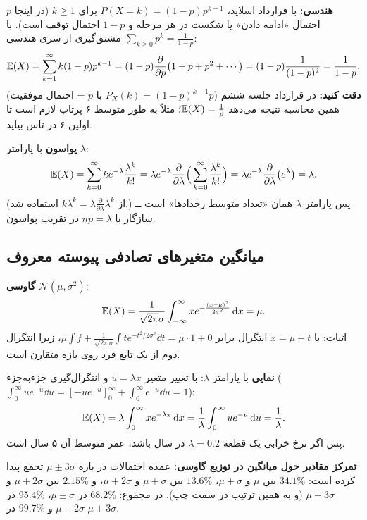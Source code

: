 \begin{example}
\textbf{هندسی:} با قرارداد اسلاید، $P(X=k)=(1-p)p^{k-1}$ برای $k\ge1$ (در اینجا $p$ احتمال «ادامه دادن» یا شکست در هر مرحله و $1-p$ احتمال توقف است). با مشتق‌گیری از سری هندسی $\sum_{k\ge0}p^k=\frac1{1-p}$:
\[
\mathbb{E}(X)=\sum_{k=1}^{\infty}k(1-p)p^{k-1}=(1-p)\frac{\partial}{\partial p}\big(1+p+p^2+\cdots\big)=(1-p)\frac{1}{(1-p)^2}=\frac{1}{1-p}.
\]
\textbf{دقت کنید:} در قرارداد جلسه ششم ($P_X(k)=(1-p)^{k-1}p$ با $p$ = احتمال موفقیت) همین محاسبه نتیجه می‌دهد $\mathbb{E}(X)=\frac1p$؛ مثلاً به طور متوسط ۶ پرتاب لازم است تا اولین ۶ در تاس بیاید.

\textbf{پواسون} با پارامتر $\lambda$:
\[
\mathbb{E}(X)=\sum_{k=0}^{\infty}ke^{-\lambda}\frac{\lambda^k}{k!}=\lambda e^{-\lambda}\frac{\partial}{\partial\lambda}\Big(\sum_{k=0}^{\infty}\frac{\lambda^k}{k!}\Big)=\lambda e^{-\lambda}\frac{\partial}{\partial\lambda}\big(e^\lambda\big)=\lambda .
\]
(از $k\lambda^k=\lambda\frac{\partial}{\partial\lambda}\lambda^k$ استفاده شد.) پس پارامتر $\lambda$ همان «تعداد متوسط رخدادها» است ــ سازگار با $np=\lambda$ در تقریب پواسون.
\end{example}

\subsection{میانگین متغیرهای تصادفی پیوسته معروف}

\begin{example}
\textbf{گاوسی} $\mathcal N(\mu,\sigma^2)$:
\[
\mathbb{E}(X)=\frac{1}{\sqrt{2\pi}\sigma}\int_{-\infty}^{\infty}xe^{-\frac{(x-\mu)^2}{2\sigma^2}}\,\mathrm{d} x=\mu .
\]
اثبات: با $x=\mu+t$ انتگرال برابر $\mu\int f+\frac1{\sqrt{2\pi}\sigma}\int te^{-t^2/2\sigma^2}\dd t=\mu\cdot1+0$، زیرا انتگرال دوم از یک تابع فرد روی بازه متقارن است.

\textbf{نمایی} با پارامتر $\lambda$: با تغییر متغیر $u=\lambda x$ و انتگرال‌گیری جزءبه‌جزء ($\int_0^\infty ue^{-u}\dd u=[-ue^{-u}]_0^\infty+\int_0^\infty e^{-u}\dd u=1$):
\[
\mathbb{E}(X)=\lambda\int_0^\infty xe^{-\lambda x}\,\mathrm{d} x=\frac1\lambda\int_0^\infty ue^{-u}\,\mathrm{d} u=\frac1\lambda .
\]
پس اگر نرخ خرابی یک قطعه $\lambda=0.2$ در سال باشد، عمر متوسط آن ۵ سال است.
\end{example}

\begin{note}
\notetitle \textbf{تمرکز مقادیر حول میانگین در توزیع گاوسی:} عمده احتمالات در بازه $\mu\pm3\sigma$ تجمع پیدا کرده است:
$34.1\%$ بین $\mu$ و $\mu+\sigma$، $13.6\%$ بین $\mu+\sigma$ و $\mu+2\sigma$، و $2.15\%$ بین $\mu+2\sigma$ و $\mu+3\sigma$ (و به همین ترتیب در سمت چپ). در مجموع: $68.2\%$ در $\mu\pm\sigma$، $95.4\%$ در $\mu\pm2\sigma$ و $99.7\%$ در $\mu\pm3\sigma$.
\end{note}

